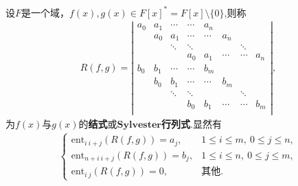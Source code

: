 \documentclass[../../main.tex]{subfiles}%
\begin{document}
\begin{definition}[结式/Sylvester行列式]
设$F$是一个域，$f(x),g(x)\in F[x]^*=F[x]\setminus \{0\}$,则称
\begin{align*}
R(f,g)=\left| \begin{matrix}
a_0&		a_1&		\cdots&		\cdots&		a_n&		&		&		\\
&		a_0&		a_1&		\cdots&		\cdots&		a_n&		&		\\
&		&		\ddots&		\ddots&		&		&		\ddots&		\\
&		&		&		a_0&		a_1&		\cdots&		\cdots&		a_n\\
b_0&		b_1&		\cdots&		\cdots&		b_m&		&		&		\\
&		b_0&		b_1&		\cdots&		\cdots&		b_m&		&		\\
&		&		\ddots&		\ddots&		&		&		\ddots&		\\
&		&		&		b_0&		b_1&		\cdots&		\cdots&		b_m\\
\end{matrix} \right|,
\end{align*}
为$f(x)$与$g(x)$的\textbf{结式}或$\mathbf{Sylvester}$\textbf{行列式}.显然有
\begin{align*}
\begin{cases}
\mathrm{ent}_{i\ i+j}(R(f,g)) = a_j, & 1 \leqslant i \leqslant m,\ 0 \leqslant j \leqslant n, \\
\mathrm{ent}_{n+i\ i+j}(R(f,g)) = b_j, & 1 \leqslant i \leqslant n,\ 0 \leqslant j \leqslant m, \\
\mathrm{ent}_{i\ j}(R(f,g)) = 0, & \text{其他}.
\end{cases}
\end{align*}
\end{definition}
\end{document}
